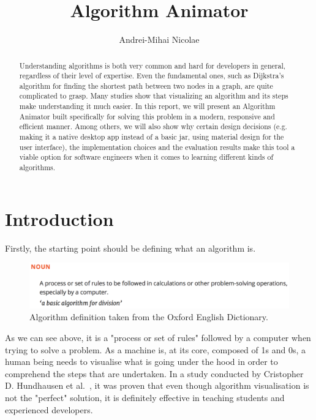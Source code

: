 \documentclass{l4proj}
\begin{document}
\title{Algorithm Animator}
\author{Andrei-Mihai Nicolae}
\maketitle

\begin{abstract}
Understanding algorithms is both very common and hard for developers in general,
regardless of their level of expertise. Even the fundamental ones, such as Dijkstra's algorithm
for finding the shortest path between two nodes in a graph, are quite complicated to grasp. Many 
studies show that visualizing an algorithm and its steps make understanding it much easier. In
this report, we will present an Algorithm Animator built specifically for solving this problem 
in a modern, responsive and efficient manner. Among others, we will also show why certain design decisions (e.g. making it a native
desktop app instead of a basic jar, using material design for the user interface), the implementation choices and the
evaluation results make this tool a viable option for software engineers when it comes to learning different kinds of 
algorithms.
\end{abstract}

\educationalconsent

\tableofcontents
\chapter{Introduction}
\label{intro}

Firstly, the starting point should be defining what an algorithm is.

\begin{figure}[!ht]
\centering
\includegraphics[scale=0.5]{algorithm}
\caption{Algorithm definition taken from the Oxford English Dictionary.}
\label{fig:algorithm}
\end{figure}

As we can see above, it is a "process or set of rules" followed by a computer when trying to solve a problem. As a machine is, at its core, composed of 1s and 0s, a human being needs to visualise what is going under the hood in order to comprehend the steps that are undertaken. In a study conducted by Cristopher D. Hundhausen et al.~\cite{av}, it was proven that even though algorithm visualisation is not the "perfect" solution, it is definitely effective in teaching students and experienced developers.
\end{document}
